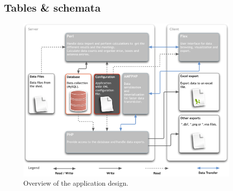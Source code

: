 \documentclass[a4paper,10pt,twoside,headings=small,bibliography=totocnumbered,headsepline]{scrartcl}
\begin{document}
\begin{appendix}
\addappheadtotoc


\newpage
\section{Tables \& schemata}
\label{sec:tables_schmemata}
\begin{figure}[htpb]
\begin{center}
  \includegraphics[width=\textwidth]{assets/pdf/application_design.pdf}
  \caption[Application design]{Overview of the application design.}
  \label{fig:app_design}
\end{center}
\end{figure}



\end{appendix}
\end{document}
